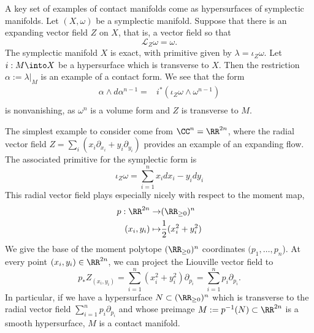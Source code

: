 

    A key set of examples of contact manifolds come as hypersurfaces of symplectic manifolds. Let $(X, \omega)$ be a symplectic manifold. Suppose that there is an expanding vector field $Z$ on $X$, that is, a vector field so that 
    \[\mathcal L_Z \omega = \omega.\]
    The symplectic manifold $X$ is exact, with primitive given by $\lambda=\iota_Z \omega$.
    Let $i:M\into  X$ be a hypersurface which is transverse to $X$. Then the restriction $\alpha:=\lambda|_M$ is an example of a contact form. We see that the form  
    \begin{align*}
        \alpha \wedge d\alpha^{n-1} =& i^* (\iota_Z \omega \wedge \omega^{n-1})\\
    \end{align*}
    is nonvanishing, as $\omega^n$ is a volume form and $Z$ is transverse to $M$.

    The simplest example to consider come from $\CC^n= \RR^{2n}$, where the radial vector field $Z=\sum_i \left(x_i \partial_{x_i} + y_i\partial_{y_i}\right)$ provides an example of an expanding flow. The associated primitive for the symplectic form is 
    \[\iota_Z \omega =\sum_{i=1}^n x_i dx_i - y_i dy_i \]
     This radial vector field plays especially nicely with respect to the moment map, 
    \begin{align*}
        p: \RR^{2n}\to& (\RR_{\geq 0})^n\\
            (x_i, y_i)\mapsto&\frac{1}{2} (x_i^2+y_i^2)
    \end{align*}
    We give the base of the moment polytope $(\RR_{\geq 0})^n$ coordinates $(p_1, \ldots, p_n$).  
    At every point $(x_i, y_i)\in \RR^{2n}$, we can project the Liouville vector field to 
    \[p_*Z_{(x_i, y_i)}= \sum_{i=1}^n (x_i^2+y_i^2) \partial_{p_i} =\sum_{i=1}^n  p_i \partial_{p_i}.\]
    In particular, if we have a hypersurface $N\subset (\RR_{\geq 0})^n$ which is transverse to the radial vector field $\sum_{i=1}^n  p_i \partial_{p_i}$ and whose preimage $M:=p^{-1}(N)\subset \RR^{2n}$ is a smooth hypersurface, $M$ is a contact manifold.
    \label{exm:contactManifold}
    

